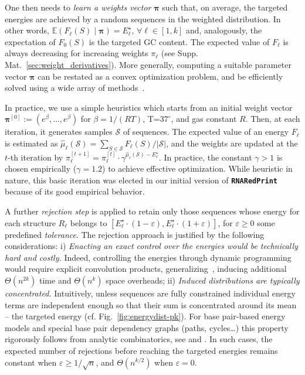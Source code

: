 \documentclass[twocolumn]{bmcart}%
\newcommand{\Def}[1]{\emph{#1}}
\newcommand{\TargetE}{E^{\star}}
\newcommand{\Nuc}[1]{{\sf #1}}
\newcommand{\Cb}{\Nuc{C}}
\newcommand{\Gb}{\Nuc{G}}
\newcommand{\GCb}{\Gb\Cb}
\newcommand{\Software}[1]{{\ttfamily #1}}
\newcommand{\ourprog}{{\tt \bfseries{}\color{black!85}RNA\textcolor{red!70!black}{Red}Print}}
\newcommand{\citep}[1]{\cite{#1}}
\begin{document}
One then needs to \Def{learn a weights vector} $\pmb{\pi}$ such that, on average, the targeted energies are achieved by a random sequences in the weighted distribution. In other words,  $\mathbb{E}(F_\ell(S)\mid \pmb{\pi})=\TargetE_\ell$,  $\forall\ell\in[1,k]$ and, analogously, the expectation of $F_0(S)$ is the targeted GC content.
The expected value of $F_\ell$ is always decreasing for increasing weights $\pi_\ell$ (see Supp. Mat.~\ref{sec:weight_derivatives}). More generally, computing a suitable parameter vector $\pmb{\pi}$ can be restated as a convex optimization problem, and be efficiently solved using a wide array of methods~\citep{Denise2010,Bendkowski2017}.

In practice, we use a simple heuristics which starts from an initial weight vector $\pmb{\pi}^{[0]}:=(e^\beta,\dots,e^\beta)$ for $\beta=1/(RT)$, T=$37^\circ$, and gas constant $R$. Then, at each iteration, it generates samples $\mathcal{S}$ of sequences. The expected value of an energy $F_\ell$ is estimated as $\hat\mu_\ell(\mathcal{S}) = \sum_{S\in\mathcal{S}}F_\ell(S)/|\mathcal{S}|$, and the weights are updated at the $t$-th iteration by %
$\pi_\ell^{[t+1]} = \pi_\ell^{[t]}\cdot \gamma^{\hat\mu_\ell(\mathcal{S})-\TargetE_\ell}$. In practice, the constant $\gamma>1$ is chosen empirically  ($\gamma=1.2$) to achieve effective optimization.
While heuristic in nature, this basic iteration was elected in our initial version of \ourprog{} because of its good empirical behavior.

A further \Def{rejection step} is applied to retain only those sequences whose energy for each structure $R_\ell$ belongs to $[\TargetE_\ell\cdot(1-\varepsilon),\TargetE_\ell\cdot(1+\varepsilon)]$, for $\varepsilon\ge 0$ some predefined \Def{tolerance}. The rejection approach is justified by the following considerations:
i) \emph{Enacting an exact control over the energies would  be technically hard and costly.} Indeed, controlling the energies through dynamic programming would require explicit convolution products, generalizing~\citep{Cupal1996}, inducing additional $\Theta(n^{2k})$ time and $\Theta(n^k)$ space overheads;
ii) \emph{Induced distributions are typically concentrated.} Intuitively, unless sequences are fully constrained individual energy terms are independent enough so that their sum is concentrated around its mean -- the targeted energy (cf.{} Fig.~\ref{fig:energydist-pk}).
For base pair-based energy models and special base pair dependency graphs
(paths, cycles\ldots) this property rigorously follows from analytic
combinatorics, see \citep{Bender1983} and
\citep{Drmota1997}. In such cases, the expected number of
rejections before reaching the targeted energies remains constant when
$\varepsilon\ge 1/\sqrt{n}$, and $\Theta(n^{k/2})$ when
$\varepsilon=0$. 
\end{document}
